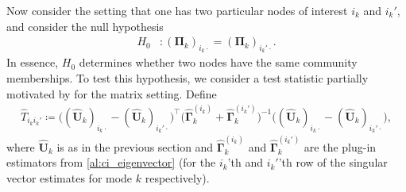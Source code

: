 \documentclass[10pt]{article}
\newcommand{\0}{{\mathbf{0}}}
\newcommand{\1}{{\mathbf{1}}}
\renewcommand{\citet}{\cite}
\renewcommand{\t}{^{\top}}
\newcommand{\uhat}{\mathbf{\hat{U}}}
\newcommand{\inv}{^{-1}}
\renewcommand{\hat}{\widehat}
\renewcommand{\hat}{\widehat}
\begin{document}
Now consider the setting that one has two particular nodes of interest $i_k$ and $i_k'$, and consider the null hypothesis
\begin{align*}
    H_0&: (\mathbf{\Pi}_k)_{i_k\cdot} = (\mathbf{\Pi}_k)_{i_k'\cdot}.
\end{align*}
In essence, $H_0$ determines whether two nodes have the same community memberships.  To test this hypothesis, we consider a test statistic partially motivated by \citet{fan_simple_2022} for the matrix setting.  Define
\begin{align*}
    \hat T_{i_k i_k'} \coloneqq \big((\uhat_k)_{i_k\cdot} - (\uhat_k)_{i_k'\cdot} \big)\t \bigg( \mathbf{\hat \Gamma}_k^{(i_k)} + \mathbf{\hat \Gamma}_k^{(i_k')} \bigg)\inv \big((\uhat_k)_{i_k\cdot} - (\uhat_k)_{i_k' \cdot} \big),
\end{align*}
where $\uhat_k$ is as in the previous section and $\mathbf{\hat \Gamma}_k^{(i_k)}$ and $\mathbf{\hat \Gamma}_k^{(i_k')}$ are the plug-in estimators from \cref{al:ci_eigenvector} (for the $i_k$'th and $i_k'$'th row of the singular vector estimates for mode $k$ respectively).
\end{document}
